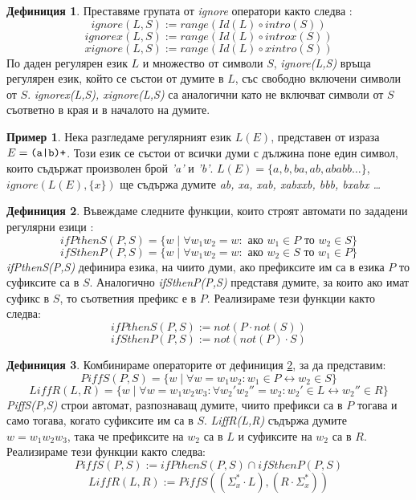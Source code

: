 \documentclass[12pt, oneside]{article}
\theoremstyle{definition}
\newtheorem{definition}{Дефиниция}[section]
\newtheorem{example}{Пример}[section]
\begin{document}
\begin{definition}
	Преставяме групата от \emph{ignore} оператори както следва \cite{Kaplan&Kay:94}:
	\[ ignore(L,S) := range(Id(L) \circ intro(S)) \]
	\[ ignorex(L,S) := range(Id(L) \circ introx(S)) \]
	\[ xignore(L,S) := range(Id(L) \circ xintro(S)) \]
	По даден регулярен език \(L\) и множество от символи \(S\), \emph{ignore(L,S)} връща регулярен език, който се състои от думите в \(L\), със свободно включени символи от \(S\). \emph{ignorex(L,S), xignore(L,S)} са аналогични като не включват символи от \(S\) съответно в края и в началото на думите.	
\end{definition}

\begin{example}
	Нека разгледаме регулярният език \(L(E)\), представен от израза \( E = \verb/(a|b)+/ \). Този език се състои от всички думи с дължина поне един символ, които съдържат произволен брой \emph{'a'} и \emph{'b'}. \( L(E) = \{a, b, ba, ab, ababb \dots \} \), \( ignore(L(E), \{x\}) \) ще съдържа думите \emph{ab, xa, xab, xabxxb, bbb, bxabx \dots }
\end{example}

\begin{definition}\label{def:defIfPThenS}
	Въвеждаме следните функции, които строят автомати по зададени регулярни езици \cite{Kaplan&Kay:94}:
	\[ ifPthenS(P,S) = \{ w \mid \forall w_1w_2 = w: \text{ ако } w_1 \in P \text{ то } w_2 \in S \} \]
	\[ ifSthenP(P,S) = \{ w \mid \forall w_1w_2 = w: \text{ ако } w_2 \in S \text{ то } w_1 \in P \} \]
	\emph{ifPthenS(P,S)} дефинира езика, на чиито думи, ако префиксите им са в езика \(P\) то суфиксите са в \(S\). Аналогично \emph{ifSthenP(P,S)} представя думите, за които ако имат суфикс в \(S\), то съответния префикс е в \(P\). Реализираме тези функции както следва:
	\[ ifPthenS(P,S) := not(P \cdot not(S)) \]
	\[ ifSthenP(P,S) := not(not(P) \cdot S) \]	
\end{definition}

\begin{definition}
	Комбинираме операторите от дефиниция \ref{def:defIfPThenS}, за да представим:
	\[ PiffS(P,S) = \{ w \mid \forall w = w_1w_2: w_1 \in P \leftrightarrow w_2 \in S \} \]
	\[ LiffR(L,R) = \{ w \mid \forall w = w_1w_2w_3: \forall w_2'w_2'' = w_2: w_2' \in L \leftrightarrow w_2'' \in R \} \]
	\emph{PiffS(P,S)} строи автомат, разпознаващ думите, чиито префикси са в \(P\) тогава и само тогава, когато суфиксите им са в \(S\). \emph{LiffR(L,R)} съдържа думите \( w = w_1w_2w_3 \), така че префиксите на \(w_2\) са в \(L\) и суфиксите на \(w_2\) са в \(R\). Реализираме тези функции както следва:
	\[ PiffS(P,S) := ifPthenS(P,S) \cap ifSthenP(P,S) \]
	\[ LiffR(L,R) := PiffS((\Sigma_x^* \cdot L), (R \cdot \Sigma_x^*)) \]	
\end{definition}
\end{document}
